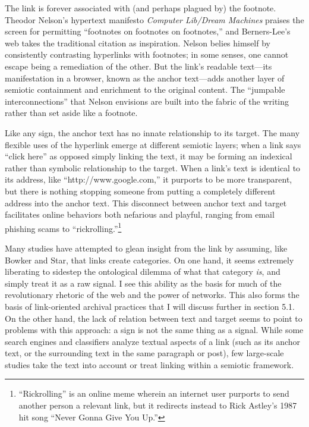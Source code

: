 The link is forever associated with (and perhaps plagued by) the footnote. Theodor Nelson's hypertext manifesto \emph{Computer Lib/Dream Machines} praises the screen for permitting ``footnotes on footnotes on footnotes,''\autocite[DM19]{nelson_computer_1974} and Berners-Lee's web takes the traditional citation as inspiration. Nelson belies himself by consistently contrasting hyperlinks with footnotes; in some senses, one cannot escape being a remediation of the other. But the link's readable text---its manifestation in a browser, known as the anchor text---adds another layer of semiotic containment and enrichment to the original content. The ``jumpable interconnections'' that Nelson envisions are built into the fabric of the writing rather than set aside like a footnote.

Like any sign, the anchor text has no innate relationship to its target. The many flexible uses of the hyperlink emerge at different semiotic layers; when a link says ``click here'' as opposed simply linking the text, it may be forming an indexical rather than symbolic relationship to the target. When a link's text is identical to its address, like ``http://www.google.com,'' it purports to be more transparent, but there is nothing stopping someone from putting a completely different address into the anchor text. This disconnect between anchor text and target facilitates online behaviors both nefarious and playful, ranging from email phishing scams to ``rickrolling.''\footnote{``Rickrolling'' is an online meme wherein an internet user purports to send another person a relevant link, but it redirects instead to Rick Astley's 1987 hit song ``Never Gonna Give You Up.''}

Many studies have attempted to glean insight from the link by assuming, like Bowker and Star, that links create categories. On one hand, it seems extremely liberating to sidestep the ontological dilemma of what that category \emph{is}, and simply treat it as a raw signal. I see this ability as the basis for much of the revolutionary rhetoric of the web and the power of networks. This also forms the basis of link-oriented archival practices that I will discuss further in section 5.1. %
On the other hand, the lack of relation between text and target seems to point to problems with this approach: a sign is not the same thing as a signal. While some search engines and classifiers analyze textual aspects of a link (such as its anchor text, or the surrounding text in the same paragraph or post), few large-scale studies take the text into account or treat linking within a semiotic framework.

